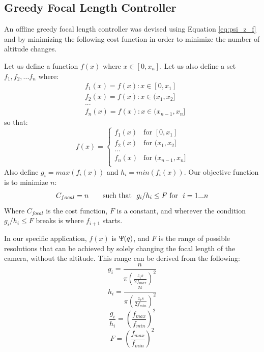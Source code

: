 \documentclass[conference]{IEEEtran}
\theoremstyle{plain}%
\begin{document}
\subsection{Greedy Focal Length Controller}
An offline greedy focal length controller was devised using Equation \ref{eq:psi_z_f} and by minimizing the following cost function in order to minimize the number of altitude changes.

Let us define a function $f(x)$ where $x \in [0, x_n]$. Let us also define a set $f_1, f_2, ... f_n$ where:
\begin{align}
& f_1(x) = f(x) : x \in [0, x_1]\\
& f_2(x) = f(x) : x \in (x_1, x_2]\\
& ... \\
& f_n(x) = f(x) : x \in (x_{n-1}, x_n]
\end{align}
so that:
\begin{equation*}
 f(x)=  \left\{
\begin{array}{ll}
      f_1(x) & \text{for } [0,x_1] \\
      f_2(x) & \text{for } (x_1,x_2] \\
      ...\\
      f_n(x) & \text{for } (x_{n-1},x_n] \\
\end{array} 
\right.
\end{equation*}
Also define $g_i = max(f_i(x))$ and $h_i = min(f_i(x))$.
Our objective function is to minimize $n$:
\begin{gather} \label{eq:focal_cost}
C_{focal} = n
\tag*{\text{such that } $g_i/h_i \leq F$ \text{for } $i = 1...n$}
\end{gather}
Where $C_{focal}$ is the cost function, $F$ is a constant, and wherever the condition $g_i/h_i \leq F$ breaks is where $f_{i+1}$ starts. 

In our specific application, $f(x)$ is $\Uppsi(q)$, and $F$ is the range of possible resolutions that can be achieved by solely changing the focal length of the camera, without the altitude. This range can be derived from the following:
\begin{equation}
g_i = \frac{n}{\pi \left( \frac{z_i s}{ 2 f_{max}} \right)^2}
\end{equation}
\begin{equation}
h_i = \frac{n}{\pi \left( \frac{z_i s}{ 2 f_{min}} \right)^2}
\end{equation}
\begin{equation}
\frac{ g_i }{ h_i } = \left( \frac{ f_{max} }{ f_{min} } \right)^2
\end{equation}
\begin{equation} \label{eq:maxresolutionrange}
F = \left( \frac{ f_{max} }{ f_{min} } \right)^2
\end{equation}
\end{document}
